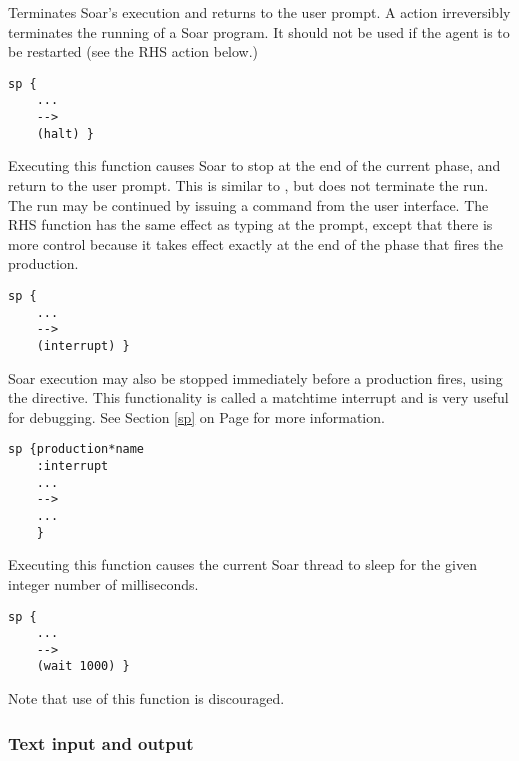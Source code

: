 \begin{description}
\item [\soarb{halt} ---] Terminates Soar's execution and returns to 
the user prompt.  A  action irreversibly terminates the
running of a Soar program.
It should not be used if the agent is to be restarted (see the
  RHS action below.)
\begin{verbatim}
sp {
    ...
    -->
    (halt) }
\end{verbatim} 

\item [\soarb{interrupt} --- ]
        Executing this function causes Soar to stop at the end of the
        current phase, and return to the user prompt. This is similar 
        to , but does not terminate the run.
        The run may be continued by issuing a  command from
	the user interface.  The  RHS function has the
	same effect as typing  at the prompt, except
	that there is more control because it takes effect exactly
	at the end of the phase that fires the production.
\begin{verbatim}
sp {
    ...
    -->
    (interrupt) }
\end{verbatim}
	
	\label{interrupt-directive}
	Soar execution may also be stopped immediately before a production
	fires, using the  directive. This functionality is
	called a matchtime interrupt and is very useful for debugging. See
	Section	\ref{sp} on Page \pageref{sp} for more information.
	
\begin{verbatim}
sp {production*name
    :interrupt
    ...
    -->
    ...
    }
\end{verbatim}

\item [\soarb{wait} --- ]
	Executing this function causes the current Soar thread to sleep for the given integer
	number of milliseconds.
\begin{verbatim}
sp {
    ...
    -->
    (wait 1000) }
\end{verbatim}

	Note that use of this function is discouraged.
\end{description}

\subsubsection{Text input and output}

